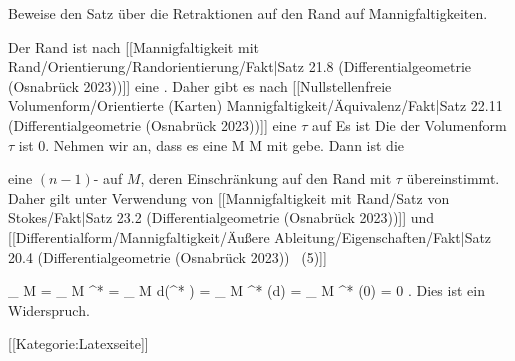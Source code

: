 {

Beweise den Satz über die Retraktionen auf den Rand auf Mannigfaltigkeiten.

}
{

Der Rand
 ist nach
[[Mannigfaltigkeit mit Rand/Orientierung/Randorientierung/Fakt|Satz 21.8 (Differentialgeometrie (Osnabrück 2023))]]
eine
 {} {.}
Daher gibt es nach
[[Nullstellenfreie Volumenform/Orientierte (Karten) Mannigfaltigkeit/Äquivalenz/Fakt|Satz 22.11 (Differentialgeometrie (Osnabrück 2023))]]
eine
$\tau$ auf
 Es ist
 Die
der Volumenform $\tau$ ist $0$. Nehmen wir an, dass es eine
\maabbdisp {\varphi} { M } { \partial M
} {}
mit
 gebe. Dann ist die

\mathl{\varphi^* \tau}{} eine
$(n-1)$-
auf $M$, deren Einschränkung auf den Rand mit $\tau$ übereinstimmt. Daher gilt unter Verwendung von
[[Mannigfaltigkeit mit Rand/Satz von Stokes/Fakt|Satz 23.2 (Differentialgeometrie (Osnabrück 2023))]]
und
[[Differentialform/Mannigfaltigkeit/Äußere Ableitung/Eigenschaften/Fakt|Satz 20.4 (Differentialgeometrie (Osnabrück 2023))  (5)]]

\mavergleichskettealign
{\vergleichskettealign
{
\int_{  \partial M  }  \tau
}
{ =} {
\int_{  \partial  M  }  \varphi^* \tau
}
{ =} {
\int_{   M  }  d(\varphi^* \tau)
}
{ =} {
\int_{   M  }  \varphi^* (d\tau)
}
{ =} {
\int_{   M  }  \varphi^* (0)
}
}
{
\vergleichskettefortsetzungalign
{ =} { 0
}
{ } {}
{ } {}
{ } {}
}
{}{.}
Dies ist ein Widerspruch.

 }

 [[Kategorie:Latexseite]]
